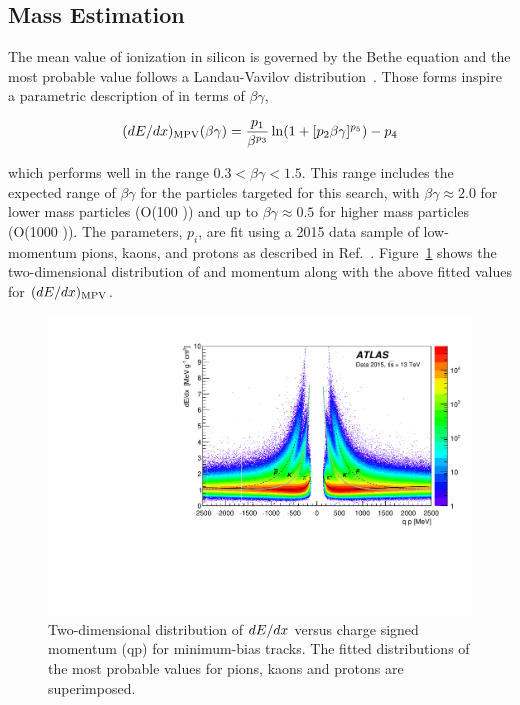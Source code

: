 \subsection{Mass Estimation}
\label{sec:mass_requirement}
The mean value of ionization in silicon is governed by the Bethe equation and the most probable value follows a Landau-Vavilov distribution~\cite{pdg}. 
Those forms inspire a parametric description of \dedx in terms of $\beta\gamma$, 

\begin{equation}
(dE/dx)_\mathrm{MPV}(\beta \gamma) = {p_1\over \beta^{p_3}}\ln(1+[p_2\beta\gamma]^{p_5})-p_4 \label{eq:bbfun}
\end{equation}

\noindent which performs well in the range $0.3< \beta\gamma<1.5$.
This range includes the expected range of $\beta\gamma$ for the particles targeted for this search, with $\beta\gamma \approx 2.0$ for lower mass particles (O(100 \GeV)) and up to $\beta\gamma \approx 0.5$ for higher mass particles (O(1000 \GeV)). 
The parameters, $p_i$, are fit using a 2015 data sample of low-momentum pions, kaons, and protons as described in Ref.~\cite{dedxnote}. 
Figure~\ref{fig:dedx_momentum} shows the two-dimensional distribution of \dedx and momentum along with the above fitted values for $(dE/dx)_\mathrm{MPV}$.

\begin{figure}
\centering
\includegraphics[width=\fullfig]{figures/dedx_momentum.pdf}
\caption{Two-dimensional distribution of $dE/dx$ versus charge signed momentum (qp) for minimum-bias tracks. The fitted distributions of the most probable values for pions, kaons and protons are superimposed.}
\label{fig:dedx_momentum}
\end{figure}

